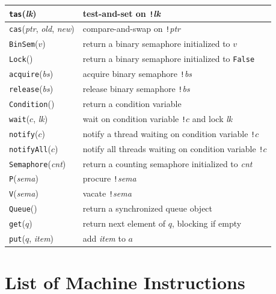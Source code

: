 \documentclass{report}
\begin{document}
\vspace{1em}
\begin{tabular}{|l|l|}
\hline
\texttt{tas}(\textit{lk}) & test-and-set on \texttt{!}\textit{lk} \\
\hline
\texttt{cas}(\textit{ptr}, \textit{old}, \textit{new}) & compare-and-swap on \texttt{!}\textit{ptr} \\
\hline
\texttt{BinSem}($v$) & return a binary semaphore initialized to $v$ \\
\hline
\texttt{Lock}() & return a binary semaphore initialized to \texttt{False} \\
\hline
\texttt{acquire}(\textit{bs}) & acquire binary semaphore \texttt{!}\textit{bs} \\
\hline
\texttt{release}(\textit{bs}) & release binary semaphore \texttt{!}\textit{bs} \\
\hline
\texttt{Condition}() & return a condition variable \\
\hline
\texttt{wait}($c$, \textit{lk}) & wait on condition variable \texttt{!}$c$
and lock \textit{lk} \\ \hline
\texttt{notify}($c$) & notify a thread waiting on condition variable \texttt{!}$c$ \\
\hline
\texttt{notifyAll}($c$) & notify all threads waiting on condition variable \texttt{!}$c$ \\
\hline
\texttt{Semaphore}(\textit{cnt}) & return a counting semaphore initialized to \textit{cnt} \\
\hline
\texttt{P}(\textit{sema}) & procure \texttt{!}\textit{sema}  \\
\hline
\texttt{V}(\textit{sema}) & vacate \texttt{!}\textit{sema}  \\
\hline
\texttt{Queue}() & return a synchronized queue object \\
\hline
\texttt{get}($q$) & return next element of $q$, blocking if empty \\
\hline
\texttt{put}($q$, \textit{item}) & add \textit{item} to $a$ \\
\hline
\end{tabular}

\chapter{List of Machine Instructions}
\label{ap:harmonybytecode}
\end{document}
